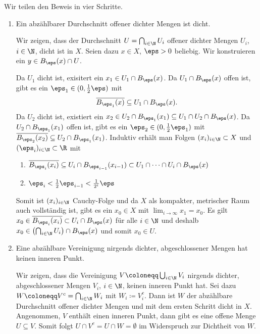 \begin{beweis}
  Wir teilen den Beweis in vier Schritte.
  \begin{enumerate}
  \item Ein abzählbarer Durchschnitt offener dichter Mengen ist dicht.

    Wir zeigen, dass der Durchschnitt $U = \bigcap_{i \in \N} U_i$ offener dichter Mengen $U_i$, $ i \in \N$, dicht ist in $X$. Seien dazu $ x \in X$, $\eps > 0$ beliebig. Wir konstruieren ein $y \in B_\eps(x) \cap U$. 

Da $U_1$ dicht ist, exisitert ein $x_1 \in U_1 \cap B_\eps(x)$. Da $U_1 \cap B_\eps (x)$ offen ist, gibt es ein $\eps_1 \in (0, \frac 1 2 \eps)$ mit
\begin{align*}
  \overline{B_{\eps_1}(x)} \subseteq U_1 \cap B_\eps(x).
\end{align*}
Da $U_2$ dicht ist, existiert ein $x_2 \in U_2 \cap B_{\eps_1}(x_1) \subseteq U_1 \cap U_2 \cap B_\eps(x)$. Da $U_2 \cap B_{\eps_1}(x_1)$ offen ist, gibt es ein $ \eps_2 \in (0,\frac 1 2 \eps_1)$ mit $\overline{B_{\eps_2}(x_2)} \subseteq U_2 \cap B_{\eps_1}(x_1)$. Induktiv erhält man Folgen $(x_i)_{i\in \N} \subset X$ und $(\eps_i)_{i \in \N} \subset \R$ mit

\begin{enumerate}
\renewcommand{\labelenumi}{(\roman{enumi})}
\item  $\overline{B_{\eps_i}(x_i)} \subseteq U_i \cap B_{\eps_{i-1}} (x_{i-1}) \subset U_1 \cap \dots \cap U_i \cap B_\eps (x)$
\item $\eps_i < \frac 1 2 \eps_{i-1} < \frac 1 {2^i} \eps$
\end{enumerate}
Somit ist $(x_i)_{i \in \N}$ Cauchy-Folge und da $X$ als kompakter, metrischer Raum auch vollständig ist, gibt es ein $x_0 \in X$ mit $\lim_{i \to \infty}x_1 = x_0$. Es gilt  $x_0 \in \overline{B_{\eps_i}(x_i)} \subset U_i \cap B_\eps(x)$ für alle $i \in \N$ und deshalb $x_0 \in \left(  \bigcap_{i \in \N} U_i \right) \cap B_\eps(x)$ und somit $x_0 \in U$. 
\item  Eine abzählbare Vereinigung nirgends dichter, abgeschlossener Mengen hat keinen inneren Punkt.

Wir zeigen, dass die Vereinigung $V \coloneqq \bigcup_{i \in \N} V_i$ nirgends dichter, abgeschlossener Mengen $V_i$, $i \in \N$, keinen inneren Punkt hat. Sei dazu $W \coloneqq V^c = \bigcap_{i \in \N} W_i$ mit $W_i \coloneqq V_i^c$. Dann ist $W$ der abzählbare Durchschnitt offener dichter Mengen und mit dem ersten Schritt dicht in $X$. Angenommen, $V$ enthält einen inneren Punkt, dann gibt es eine offene Menge $U \subseteq V$. Somit folgt $U \cap V^c = U \cap W = \emptyset$ im Widerspruch zur Dichtheit von $W$.


\end{enumerate}
\end{beweis}
